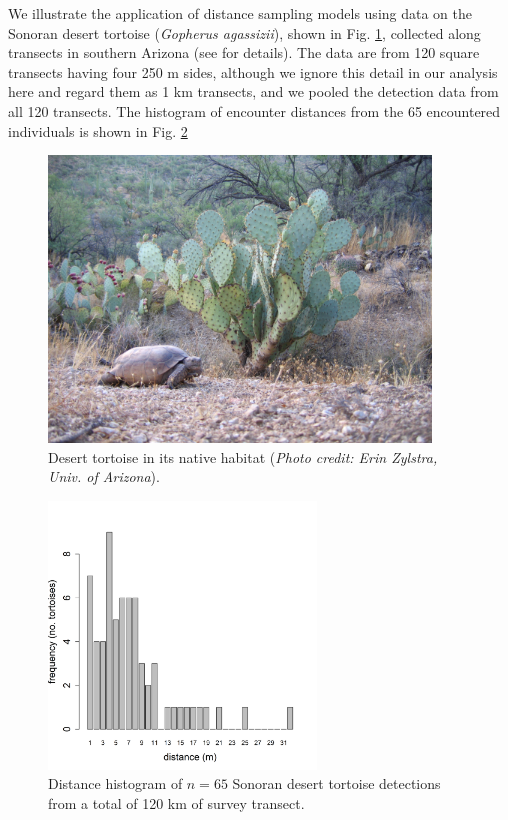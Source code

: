 We illustrate the application of distance sampling models using data
on the Sonoran desert tortoise ({\it Gopherus agassizii}), shown in
Fig. \ref{closed.fig.tortoise}, collected along transects
in southern Arizona (see \citet{zylstra_etal:2010} for
details). The data are from 120 square transects having four 250 m sides,
 although we ignore this detail in our analysis here and regard
them as 1 km transects, and we pooled the detection data from all
120 transects. The histogram of encounter distances from the 65
encountered individuals is
shown in Fig. \ref{closed.fig.tortoisehist}
\begin{figure}[ht]
\centering
\includegraphics[height=3in,width=4in]{Ch4-Closed/figs/Erin_Zylstra_2.jpg}
\caption{Desert tortoise in its native habitat ({\it Photo credit: Erin
  Zylstra, Univ. of Arizona}).}
\label{closed.fig.tortoise}
\end{figure}

\begin{figure}[ht]
\centering
\includegraphics[height=2.8in,width=2.8in]{Ch4-Closed/figs/tortoise.png}
\caption{
Distance histogram of $n=65$ Sonoran desert tortoise detections from a
total of 120 km of
survey transect. }
\label{closed.fig.tortoisehist}
\end{figure}

